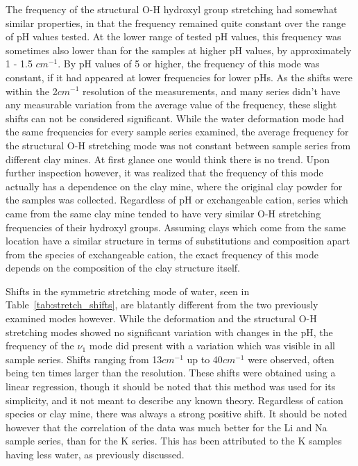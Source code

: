 The frequency of the structural O-H hydroxyl group stretching had somewhat similar properties, in that the frequency remained quite constant over the range of pH values tested. At the lower range of tested pH values, this frequency was sometimes also lower than for the samples at higher pH values, by approximately 1 - 1.5 $cm^{-1}$. By pH values of 5 or higher, the frequency of this mode was constant, if it had appeared at lower frequencies for lower pHs. As the shifts were within the 2$cm^{-1}$ resolution of the measurements, and many series didn't have any measurable variation from the average value of the frequency, these slight shifts can not be considered significant. While the water deformation mode had the same frequencies for every sample series examined, the average frequency for the structural O-H stretching mode was not constant between sample series from different clay mines. At first glance one would think there is no trend. Upon further inspection however, it was realized that the frequency of this mode actually has a dependence on the clay mine, where the original clay powder for the samples was collected. Regardless of pH or exchangeable cation, series which came from the same clay mine tended to have very similar O-H stretching frequencies of their hydroxyl groups. Assuming clays which come from the same location have a similar structure in terms of substitutions and composition apart from the species of exchangeable cation, the exact frequency of this mode depends on the composition of the clay structure itself.

Shifts in the symmetric stretching mode of water, seen in Table~\ref{tab:stretch_shifts}, are blatantly different from the two previously examined modes however. While the deformation and the structural O-H stretching modes showed no significant variation with changes in the pH, the frequency of the $\nu_1$ mode did present with a variation which was visible in all sample series. Shifts ranging from 13$cm^{-1}$ up to 40$cm^{-1}$ were observed, often being ten times larger than the resolution. These shifts were obtained using a linear regression, though it should be noted that this method was used for its simplicity, and it not meant to describe any known theory. Regardless of cation species or clay mine, there was always a strong positive shift. It should be noted however that the correlation of the data was much better for the Li and Na sample series, than for the K series. This has been attributed to the K samples having less water, as previously discussed.


